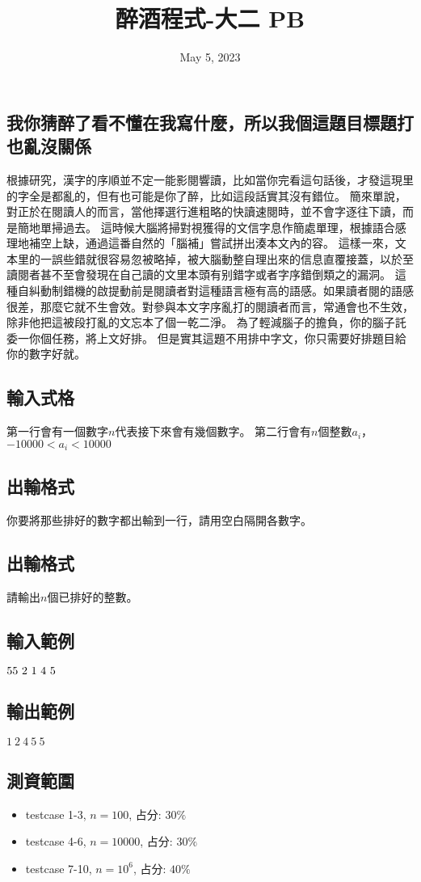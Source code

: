 \documentclass{article}
\title{醉酒程式-大二 PB}
\date{May 5, 2023}
\begin{document}
\begin{CJK*}{UTF8}{bsmi}

\maketitle

\section*{我你猜醉了看不懂在我寫什麼，所以我個這題目標題打也亂沒關係}

根據研究，漢字的序順並不定一能影閱響讀，比如當你完看這句話後，才發這現里的字全是都亂的，但有也可能是你了醉，比如這段話實其沒有錯位。
簡來單說，對正於在閱讀人的而言，當他擇選行進粗略的快讀速閱時，並不會字逐往下讀，而是簡地單掃過去。
這時候大腦將掃對視獲得的文信字息作簡處單理，根據語合感理地補空上缺，通過這番自然的「腦補」嘗試拼出湊本文內的容。
這樣一來，文本里的一誤些錯就很容易忽被略掉，被大腦動整自理出來的信息直覆接蓋，以於至讀閱者甚不至會發現在自己讀的文里本頭有别錯字或者字序錯倒類之的漏洞。
這種自糾動制錯機的啟提動前是閱讀者對這種語言極有高的語感。如果讀者閱的語感很差，那麼它就不生會效。對參與本文字序亂打的閱讀者而言，常通會也不生效，除非他把這被段打亂的文忘本了個一乾二淨。
為了輕減腦子的擔負，你的腦子託委一你個任務，將上文好排。
但是實其這題不用排中字文，你只需要好排題目給你的數字好就。

\subsection*{輸入式格}
第一行會有一個數字$n$代表接下來會有幾個數字。
第二行會有$n$個整數$a_i$，$-10000<a_i<10000$
\subsection*{出輸格式}
你要將那些排好的數字都出輸到一行，請用空白隔開各數字。

\subsection*{出輸格式}
請輸出$n$個已排好的整數。

\subsection*{輸入範例}
$5\\5\ 2\ 1\ 4\ 5$
\subsection*{輸出範例}
$1\ 2\ 4\ 5\ 5$

\subsection*{測資範圍}
\begin{itemize}
    \item testcase 1-3, $n=100$, 占分: $30\%$
    \item testcase 4-6, $n=10000$, 占分: $30\%$
    \item testcase 7-10, $n=10^6$, 占分: $40\%$
\end{itemize}

\end{CJK*}
\end{document}
